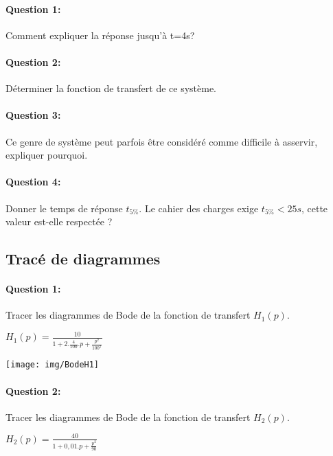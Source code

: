 \paragraph{Question 1:} Comment expliquer la réponse jusqu'à t=4s?

\paragraph{Question 2:} Déterminer la fonction de transfert de ce système.

\paragraph{Question 3:} Ce genre de système peut parfois être considéré comme difficile à asservir, expliquer pourquoi.

\paragraph{Question 4:} Donner le temps de réponse $t_{5\%}$. Le cahier des charges exige $t_{5\%}<25s$, cette valeur est-elle respectée ?

\newpage

\subsection{Tracé de diagrammes}

\paragraph{Question 1:} Tracer les diagrammes de Bode de la fonction de transfert $H_1(p)$.

\begin{center}
$H_1(p)=\frac{10}{1+2.\frac{4}{100}.p+\frac{p^2}{100^2}}$
\end{center}

\begin{center}
 \texttt{[image: img/BodeH1]}
\end{center}

\paragraph{Question 2:} Tracer les diagrammes de Bode de la fonction de transfert $H_2(p)$.

\begin{center}
$H_2(p)=\frac{40}{1+0,01.p+\frac{p^2}{90}}$
\end{center}

